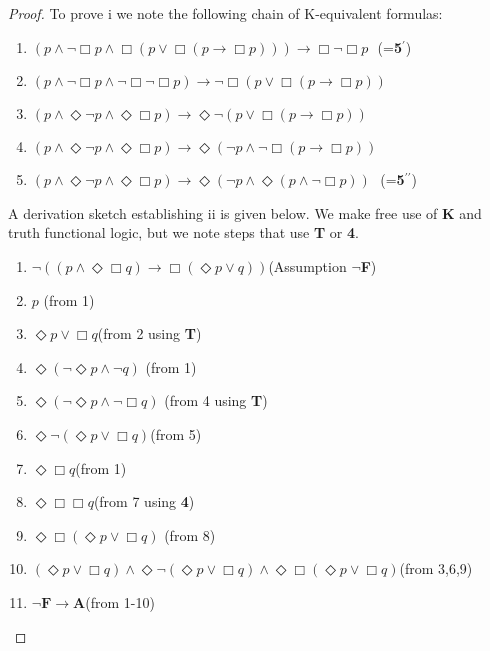 \documentclass[11pt]{article}
\begin{document}
\begin{proof}
To prove i we note the following chain of K-equivalent formulas:
\begin{enumerate}
\item{$(p \wedge \neg \Box p \wedge \Box (p \vee \Box (p \rightarrow \Box p))) \rightarrow \Box \neg \Box p~~~$(=\textbf{5}$^\prime$) }
\item{$ (p \wedge \neg \Box p \wedge \neg \Box \neg \Box p) \rightarrow \neg \Box (p \vee \Box (p \rightarrow \Box p))$}
\item{$(p \wedge \Diamond\neg p \wedge \Diamond\Box p) \rightarrow \Diamond\neg (p \vee \Box (p \rightarrow \Box p))$}
\item{$(p \wedge \Diamond\neg p \wedge \Diamond\Box p) \rightarrow \Diamond(\neg p \wedge \neg \Box (p \rightarrow \Box p))$}
\item{$(p \wedge \Diamond\neg p \wedge \Diamond\Box p) \rightarrow \Diamond(\neg p \wedge \Diamond(p \wedge \neg \Box p))~~~$(=\textbf{5}$^{\prime\prime}$) }
\end{enumerate}

A derivation sketch establishing ii is given below. We make free use of \textbf{K} and truth functional logic, but we note steps that use \textbf{T} or \textbf{4}.
\begin{enumerate}
\item{$ \neg ((p\wedge \Diamond\Box q) \rightarrow \Box (\Diamond{p}\vee q))$\tab\tab\tab (Assumption $\neg $\textbf{F})}
\item{$p$ \tab\tab\tab\tab\tab(from 1)}
\item{$\Diamond{p}\vee \Box q$\tab\tab\tab\tab\tab(from 2 using \textbf{T})}
\item{$\Diamond(\neg \Diamond{p}\wedge \neg q)$ \tab\tab\tab\tab(from 1)}
\item{$\Diamond(\neg \Diamond{p}\wedge \neg \Box q)$ \tab\tab\tab\tab (from 4 using \textbf{T})}
\item{$\Diamond\neg (\Diamond{p}\vee \Box q)$\tab\tab\tab\tab (from 5)}
\item{$ \Diamond\Box q$\tab\tab\tab\tab\tab (from 1)}
\item{$ \Diamond\Box \Box q$\tab\tab\tab\tab\tab(from 7 using \textbf{4})}
\item{$\Diamond\Box (\Diamond{p}\vee \Box q)$ \tab\tab\tab\tab(from 8)}
\item{$ (\Diamond{p}\vee \Box q) \wedge \Diamond\neg (\Diamond{p}\vee \Box q)\wedge \Diamond\Box (\Diamond{p}\vee \Box q)$\tab(from 3,6,9)}
\item{$\neg \textbf{F} \rightarrow \textbf{A}$\tab\tab\tab\tab\tab(from 1-10)}
\end{enumerate}


\end{proof}
\end{document}
